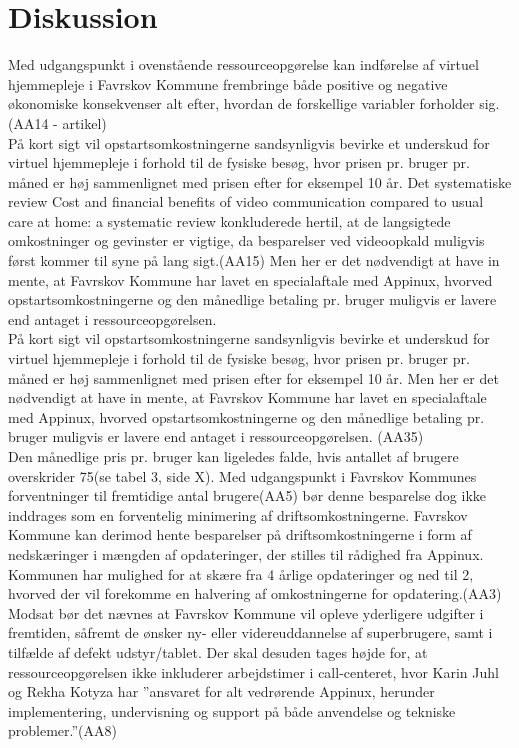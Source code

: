 \section{Diskussion}
Med udgangspunkt i ovenstående ressourceopgørelse kan indførelse af virtuel hjemmepleje i Favrskov Kommune frembringe både positive og negative økonomiske konsekvenser alt efter, hvordan de forskellige variabler forholder sig. (AA14 - artikel)\\
På kort sigt vil opstartsomkostningerne sandsynligvis bevirke et underskud for virtuel hjemmepleje i forhold til de fysiske besøg, hvor prisen pr. bruger pr. måned er høj sammenlignet med prisen efter for eksempel 10 år. Det systematiske review Cost and financial benefits of video communication compared to usual care at home: a systematic review konkluderede hertil, at de langsigtede omkostninger og gevinster er vigtige, da besparelser ved videoopkald muligvis først kommer til syne på lang sigt.(AA15) Men her er det nødvendigt at have in mente, at Favrskov Kommune har lavet en specialaftale med Appinux, hvorved opstartsomkostningerne og den månedlige betaling pr. bruger muligvis er lavere end antaget i ressourceopgørelsen.\\
På kort sigt vil opstartsomkostningerne sandsynligvis bevirke et underskud for virtuel hjemmepleje i forhold til de fysiske besøg, hvor prisen pr. bruger pr. måned er høj sammenlignet med prisen efter for eksempel 10 år. Men her er det nødvendigt at have in mente, at Favrskov Kommune har lavet en specialaftale med Appinux, hvorved opstartsomkostningerne og den månedlige betaling pr. bruger muligvis er lavere end antaget i ressourceopgørelsen. (AA35)\\
Den månedlige pris pr. bruger kan ligeledes falde, hvis antallet af brugere overskrider 75(se tabel 3, side X). Med udgangspunkt i Favrskov Kommunes forventninger til fremtidige antal brugere(AA5) bør denne besparelse dog ikke inddrages som en forventelig minimering af driftsomkostningerne. 
Favrskov Kommune kan derimod hente besparelser på driftsomkostningerne i form af nedskæringer i mængden af opdateringer, der stilles til rådighed fra Appinux. Kommunen har mulighed for at skære fra 4 årlige opdateringer og ned til 2, hvorved der vil forekomme en halvering af omkostningerne for opdatering.(AA3)
Modsat bør det nævnes at Favrskov Kommune vil opleve yderligere udgifter i fremtiden, såfremt de ønsker ny- eller videreuddannelse af superbrugere, samt i tilfælde af defekt udstyr/tablet.  
Der skal desuden tages højde for, at ressourceopgørelsen ikke inkluderer arbejdstimer i call-centeret, hvor Karin Juhl og Rekha Kotyza har ”ansvaret for alt vedrørende Appinux, herunder implementering, undervisning og support på både anvendelse og tekniske problemer.”(AA8)
